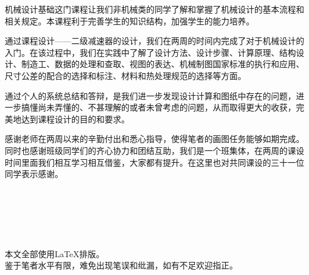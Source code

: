 \par 机械设计基础这门课程让我们非机械类的同学了解和掌握了机械设计的基本流程和相关规定。本课程利于完善学生的知识结构，加强学生的能力培养。
\par 通过课程设计——二级减速器的设计，我们在两周的时间内完成了对于机械设计的入门。在该过程中，我们在实践中了解了设计方法、设计步骤、计算原理、结构设计、制造工、数据的处理和查取、视图的表达、机械制图国家标准的执行和应用、尺寸公差的配合的选择和标注、材料和热处理规范的选择等方面。
\par 通过个人的系统总结和答辩，是我们进一步发现设计计算和图纸中存在的问题，进一步搞懂尚未弄懂的、不甚理解的或者未曾考虑的问题，从而取得更大的收获，完美地达到课程设计的目的和要求。
\par 感谢老师在两周以来的辛勤付出和悉心指导，使得笔者的画图任务能够如期完成。同时也感谢班级同学们的齐心协力和团结互助，我们是一个班集体，在两周的课设时间里面我们相互学习相互借鉴，大家都有提升。在这里也对共同课设的三十一位同学表示感谢。
\par ~
\par ~
\par ~
\begin{center}
	\large {本文全部使用\LaTeX 排版。\\
		鉴于笔者水平有限，难免出现笔误和纰漏，如有不足欢迎指正。}
\end{center}
